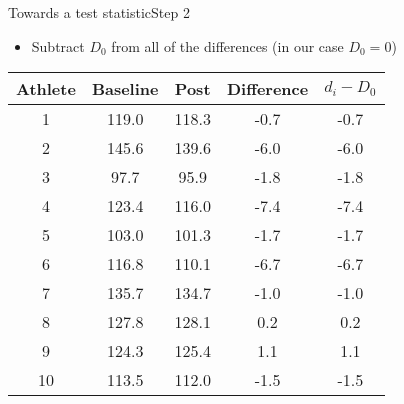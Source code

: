 \documentclass[xcolor=dvipsnames]{beamer}
\begin{document}
\begin{frame}{Towards a test statistic}{Step 2}
\begin{itemize}
	\item Subtract $D_0$ from all of the differences (in our case $D_0 = 0$)
\end{itemize}
\begin{center}
	\begin{tabular}{|c|c|c|c|c|}
		\hline
		\textbf{Athlete} &  \textbf{Baseline} &      \textbf{Post}    & \textbf{Difference} & $d_i -D_0$ \\ \hline 
		\hline
		1  &     119.0 &  118.3 &  -0.7 & -0.7\\ \hline
		2   &    145.6 &  139.6 &  -6.0 & -6.0\\ \hline
		3    &    97.7 &   95.9 &  -1.8 &  -1.8\\ \hline
		4    &   123.4 &  116.0 &  -7.4&  -7.4\\ \hline
		5    &   103.0 &  101.3 &  -1.7&  -1.7\\ \hline
		6    &   116.8 &  110.1 &  -6.7&  -6.7\\ \hline
		7     &  135.7 &  134.7 &  -1.0&  -1.0\\ \hline
		8     &  127.8 &  128.1 &   0.2&   0.2\\ \hline
		9     &  124.3 &  125.4 &   1.1&   1.1\\ \hline
		10    &  113.5 &  112.0 &  -1.5&  -1.5\\ \hline
	\end{tabular}
\end{center}
\end{frame}
\end{document}
